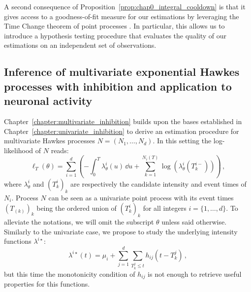     A second consequence of Proposition~\ref{prop:chap0_integral_cooldown} is that it gives access to a goodness-of-fit measure for our estimations by leveraging the Time Change theorem of point processes \parencite[Theorem 7.4.IV]{DaleyV1}.
    In particular, this allows us to introduce a hypothesis testing procedure that evaluates the quality of our estimations on an independent set of observations.
    






    \subsection{Inference of multivariate exponential Hawkes processes with inhibition and application to neuronal activity}
    Chapter~\ref{chapter:multivariate_inhibition} builds upon the bases established in Chapter~\ref{chapter:univariate_inhibition} to derive an estimation procedure for multivariate Hawkes processes $N = (N_1, \ldots, N_d)$. 
    In this setting the log-likelihood of $N$ reads:
    \[\ell_T(\theta) = \sum_{i=1}^{d}{\left(- \int_{0}^{T}{\lambda_\theta^i(u)\,\dd u} + \sum_{k=1}^{N_i(T)}{\log(\lambda^i_\theta(T_k^{i-}))} \right)}\,,\]
    where $\lambda^i_\theta$ and $(T_k^i)_k$ are respectively the candidate intensity and event times of $N_i$.
    Process $N$ can be seen as a univariate point process with its event times $(T_{(k)})_k$ being the ordered union of $(T_k^i)_k$ for all integers $i=\{1, \ldots, d\}$.
    To alleviate the notations, we will omit the subscript $\theta$ unless said otherwise.
    Similarly to the univariate case, we propose to study the underlying intensity functions $\lambda^{i\star}$:
    \[\lambda^{i\star}(t) = \mu_i + \sum_{j=1}^{d}\sum_{T_k^j \leq t}{h_{ij}(t-T_k^j)}\,,\]
    but this time the monotonicity condition of $h_{ij}$ is not enough to retrieve useful properties for this functions.

